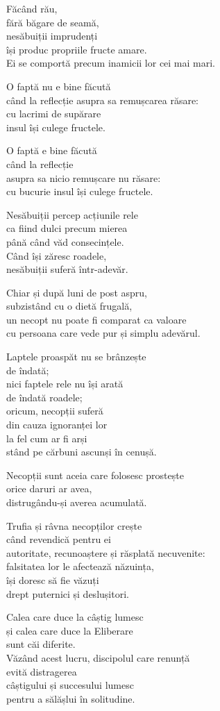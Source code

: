 Făcând rău,\\
fără băgare de seamă,\\
nesăbuiții imprudenți\\
își produc propriile fructe amare.\\
Ei se comportă precum inamicii lor cei mai mari.

O faptă nu e bine făcută\\
când la reflecție asupra sa remușcarea răsare:\\
cu lacrimi de supărare\\
insul își culege fructele.


O faptă e bine făcută\\
când la reflecție\\
asupra sa nicio remușcare nu răsare:\\
cu bucurie insul își culege fructele.


Nesăbuiții percep acțiunile rele\\
ca fiind dulci precum mierea\\
până când văd consecințele.\\
Când își zăresc roadele,\\
nesăbuiții suferă într-adevăr.


Chiar și după luni de post aspru,\\
subzistând cu o dietă frugală,\\
un necopt nu poate fi comparat ca valoare\\
cu persoana care vede pur și simplu adevărul.


Laptele proaspăt nu se brânzește\\
de îndată;\\
nici faptele rele nu își arată\\
de îndată roadele;\\
oricum, necopții suferă\\
din cauza ignoranței lor\\
la fel cum ar fi arși\\
stând pe cărbuni ascunși în cenușă.


Necopții sunt aceia care folosesc prostește\\
orice daruri ar avea,\\
distrugându-și averea acumulată.


Trufia și râvna necopților crește\\
când revendică pentru ei\\
autoritate, recunoaștere și răsplată necuvenite:\\
falsitatea lor le afectează năzuința,\\
își doresc să fie văzuți\\
drept puternici și deslușitori.



Calea care duce la câștig lumesc\\
și calea care duce la Eliberare\\
sunt căi diferite.\\
Văzând acest lucru, discipolul care renunță\\
evită distragerea\\
câștigului și succesului lumesc\\
pentru a sălășlui în solitudine.
